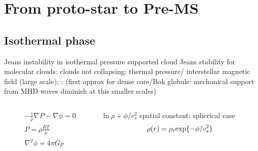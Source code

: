 \section{From proto-star to Pre-MS}

\subsection{Isothermal phase}

\begin{frame}{Jeans instability in isothermal pressure supported cloud}
Jeans stability for molecular clouds: clouds not collapsing: thermal pressure/ interstellar magnetic field (large scale); : (first approx for dense core/Bok globule: mechanical support from MHD waves diminish at this smaller scales)
\begin{columns}[T]\begin{column}{0.5\textwidth}
\begin{align*}
&-\frac{1}{\rho}\nabla P-\nabla \phi=0\\
&P=\rho\frac{RT}{\mu}\\
&\nabla^2\phi=4\pi G\rho
\end{align*}
\end{column}\begin{column}{0.5\textwidth}
$\ln{\rho}+\phi/c_s^2$ spatial constant: spherical case
\begin{equation*}
\rho(r)=\rho_c\text{exp}\{-\phi/c_s^2\}
\end{equation*}
\end{column}\end{columns}
\end{frame}
 
